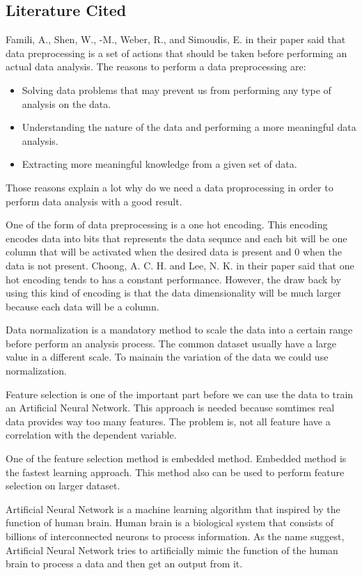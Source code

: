 \documentclass[a4paper, 12pt]{article}
\begin{document}
\begin{multicols}{2}
\section{Literature Cited}
Famili, A., Shen, W., -M., Weber, R., and Simoudis, E. in their paper said that data preprocessing is a set of actions that should be taken before performing an actual data analysis. The reasons to perform a data preprocessing are:
  \begin{itemize}
    \item Solving data problems that may prevent us from performing any type of analysis on the data.
    \item Understanding the nature of the data and performing a more meaningful data analysis.
    \item Extracting more meaningful knowledge from a given set of data.
  \end{itemize}
Those reasons explain a lot why do we need a data proprocessing in order to perform data analysis with a good result. \cite{famili1997}

One of the form of data preprocessing is a one hot encoding. This encoding encodes data into bits that represents the data sequnce and each bit will be one column that will be activated when the desired data is present and 0 when the data is not present. Choong, A. C. H. and Lee, N. K. in their paper said that one hot encoding tends to has a constant performance. However, the draw back by using this kind of encoding is that the data dimensionality will be much larger because each data will
  be a column. \cite{choong2017} 

Data normalization is a mandatory method to scale the data into a certain range before perform an analysis process. The common dataset usually have a large value in a different scale. To mainain the variation of the data we could use normalization. \cite{patro2015}

  Feature selection is one of the important part before we can use the data to train an Artificial Neural Network. This approach is needed because somtimes real data provides way too many features. The problem is, not all feature have a correlation with the dependent variable. \cite{kira1992} 

  One of the feature selection method is embedded method. Embedded method is the fastest learning approach. This method also can be used to perform feature selection on larger dataset. \cite{lal2006}

  Artificial Neural Network is a machine learning algorithm that inspired by the function of human brain. Human brain is a biological system that consists of billions of interconnected neurons to process information. As the name suggest, Artificial Neural Network tries to artificially mimic the function of the human brain to process a data and then get an output from it. \cite{wan2003}


\end{multicols}
\end{document}
